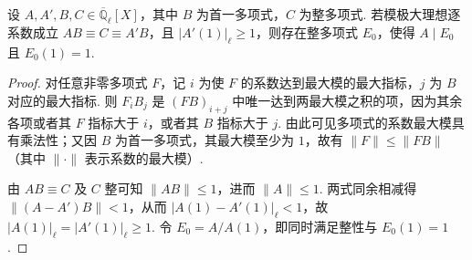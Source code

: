 \begin{lemma}[首一因子消去与余因子的整归一化]
\label{lem:c-hecke-chain-integral-normalization}
\emitthmsource
设 $A,A',B,C\in\overline{\mathbb Q}_\ell[X]$，其中 $B$ 为首一多项式，$C$ 为整多项式. 若模极大理想逐系数成立 $AB\equiv C\equiv A'B$，且 $|A'(1)|_\ell\ge1$，则存在整多项式 $E_0$，使得 $A\mid E_0$ 且 $E_0(1)=1$.
\end{lemma}
\begin{proof}
对任意非零多项式 $F$，记 $i$ 为使 $F$ 的系数达到最大模的最大指标，$j$ 为 $B$ 对应的最大指标. 则 $F_i B_j$ 是 $(FB)_{i+j}$ 中唯一达到两最大模之积的项，因为其余各项或者其 $F$ 指标大于 $i$，或者其 $B$ 指标大于 $j$. 由此可见多项式的系数最大模具有乘法性；又因 $B$ 为首一多项式，其最大模至少为 $1$，故有 $\|F\|\le\|FB\|$（其中 $\|\cdot\|$ 表示系数的最大模）.

由 $AB\equiv C$ 及 $C$ 整可知 $\|AB\|\le1$，进而 $\|A\|\le1$. 两式同余相减得 $\|(A-A')B\|<1$，从而 $|A(1)-A'(1)|_\ell<1$，故 $|A(1)|_\ell=|A'(1)|_\ell\ge1$. 令 $E_0=A/A(1)$，即同时满足整性与 $E_0(1)=1$.
\end{proof}


